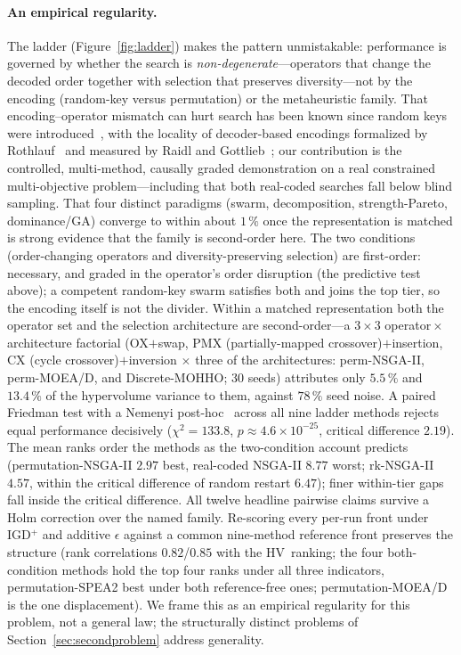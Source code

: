 \documentclass[runningheads]{llncs}
\newcommand{\HV}{\textsf{HV}}
\begin{document}
\paragraph{An empirical regularity.}
The ladder (Figure~\ref{fig:ladder}) makes the pattern unmistakable: performance is governed by whether the search is \emph{non-degenerate}---operators that change the decoded order together with selection that preserves diversity---not by the encoding (random-key versus permutation) or the metaheuristic family. That encoding--operator mismatch can hurt search has been known since random keys were introduced~\cite{bean}, with the locality of decoder-based encodings formalized by Rothlauf~\cite{rothlauf} and measured by Raidl and Gottlieb~\cite{raidl}; our contribution is the controlled, multi-method, causally graded demonstration on a real constrained multi-objective problem---including that both real-coded searches fall below blind sampling. That four distinct paradigms (swarm, decomposition, strength-Pareto, dominance/GA) converge to within about $1\,\%$ once the representation is matched is strong evidence that the family is second-order here. The two conditions (order-changing operators and diversity-preserving selection) are first-order: necessary, and graded in the operator's order disruption (the predictive test above); a competent random-key swarm satisfies both and joins the top tier, so the encoding itself is not the divider. Within a matched representation both the operator set and the selection architecture are second-order---a $3\times3$ operator${}\times{}$architecture factorial (OX${+}$swap, PMX (partially-mapped crossover)${+}$insertion, CX (cycle crossover)${+}$inversion $\times$ three of the architectures: perm-NSGA-II, perm-MOEA/D, and Discrete-MOHHO; 30 seeds) attributes only $5.5\,\%$ and $13.4\,\%$ of the hypervolume variance to them, against $78\,\%$ seed noise. A paired Friedman test with a Nemenyi post-hoc~\cite{demsar} across all nine ladder methods rejects equal performance decisively ($\chi^2=133.8$, $p\approx4.6\times10^{-25}$, critical difference $2.19$). The mean ranks order the methods as the two-condition account predicts (permutation-NSGA-II $2.97$ best, real-coded NSGA-II $8.77$ worst; rk-NSGA-II $4.57$, within the critical difference of random restart $6.47$); finer within-tier gaps fall inside the critical difference. All twelve headline pairwise claims survive a Holm correction over the named family. Re-scoring every per-run front under IGD$^{+}$ and additive $\epsilon$ against a common nine-method reference front preserves the structure (rank correlations $0.82$/$0.85$ with the \HV\ ranking; the four both-condition methods hold the top four ranks under all three indicators, permutation-SPEA2 best under both reference-free ones; permutation-MOEA/D is the one displacement). We frame this as an empirical regularity for this problem, not a general law; the structurally distinct problems of Section~\ref{sec:secondproblem} address generality.
\end{document}
